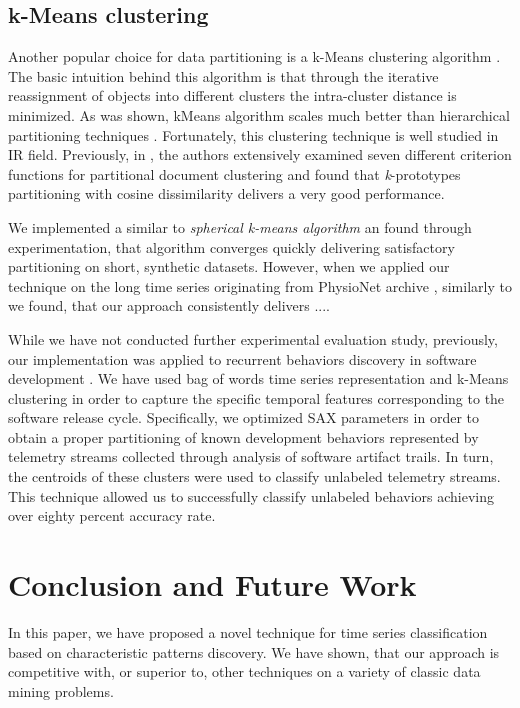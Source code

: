 \documentclass{llncs}
\begin{document}
\subsection{k-Means clustering} \label{trajectory}
Another popular choice for data partitioning is a k-Means clustering algorithm \cite{kmeans}.
The basic intuition behind this algorithm is that through the iterative reassignment of objects 
into different clusters the intra-cluster distance is minimized. As was shown, kMeans 
algorithm scales much better than hierarchical partitioning techniques \cite{kscale}.
Fortunately, this clustering technique is well studied in IR field. Previously, in \cite{zhao}, the
authors extensively examined seven different criterion functions for partitional document
clustering and found that \textit{k}-prototypes partitioning with cosine dissimilarity delivers a
very good performance. 

We implemented a similar to \cite{modha} \textit{spherical k-means algorithm} an found through
experimentation, that algorithm converges quickly delivering satisfactory partitioning on
short, synthetic datasets. However, when we applied our technique on the long time series 
originating from PhysioNet archive \cite{physionet}, similarly to \cite{bag_patterns} we found, 
that our approach consistently delivers .... 

While we have not conducted further experimental evaluation study, previously, our 
implementation was applied to recurrent behaviors discovery in software development 
\cite{android}. We have used bag of words time series representation and k-Means clustering in
order to capture the specific temporal features corresponding to the software release cycle.
Specifically, we optimized SAX parameters in order to obtain a proper partitioning of known 
development behaviors represented by telemetry streams collected through analysis of 
software artifact trails. In turn, the centroids of these clusters were used to classify unlabeled 
telemetry streams. This technique allowed us to successfully classify unlabeled behaviors 
achieving over eighty percent accuracy rate.

\section{Conclusion and Future Work}
In this paper, we have proposed a novel technique for time series classification based on 
characteristic patterns discovery. We have shown, that our approach is competitive with, 
or superior to, other techniques on a variety of classic data mining problems. 
\end{document}
